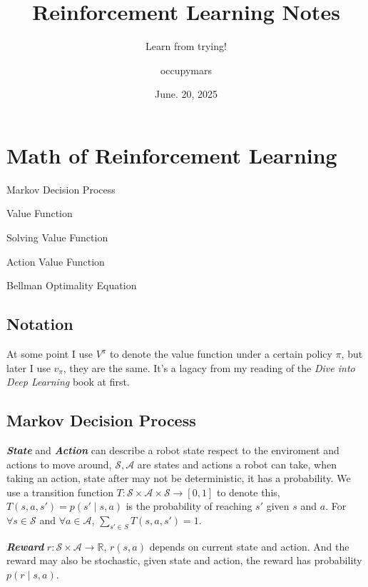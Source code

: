 \documentclass[10pt]{elegantbook}
\title{Reinforcement Learning Notes}
\subtitle{Learn from trying!}
\author{occupymars}
\date{June. 20, 2025}
\newcommand{\mydefination}[1]{\textbf{\textit{\textcolor{structurecolor}{#1}}}}
\begin{document}
\maketitle

\frontmatter
\tableofcontents

\mainmatter

\chapter{Math of Reinforcement Learning}

\begin{introduction}
    \item Markov Decision Process
    \item Value Function
    \item Solving Value Function
    \item Action Value Function
    \item Bellman Optimality Equation
\end{introduction}
    
\section{Notation}
At some point I use $V^{\pi}$ to denote the value function under a certain policy $\pi$, but later I use $v_{\pi}$, they are the same.
It's a lagacy from my reading of the \textit{Dive into Deep Learning} book at first.

\section{Markov Decision Process}
\mydefination{State} and \mydefination{Action} can describe a robot state respect to the enviroment and actions to move around, 
$\mathcal S, \mathcal A$ are states and actions a robot can take, when taking an action, state after may not
be deterministic, it has a probability. We use a transition function $T: \mathcal S \times \mathcal A \times 
\mathcal S \rightarrow [0, 1]$ to denote this, $T(s, a, s') = p(s' \mid s,a)$ is the probability of reaching $s'$
given $s$ and $a$. For $\forall s \in \mathcal S$ and $\forall a \in \mathcal A$, $\sum_{s'\in S}T(s, a, s') = 1$. 

\mydefination{Reward} $r:\mathcal S \times \mathcal A \rightarrow \mathbb R$, $r(s,a)$ depends on current state and action. And the reward
may also be stochastic, given state and action, the reward has probability $p(r \mid s, a)$.
\end{document}
